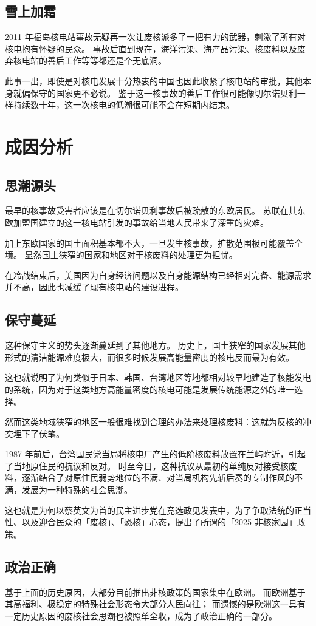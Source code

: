 \section{雪上加霜}

2011 年福岛核电站事故无疑再一次让废核派多了一把有力的武器，刺激了所有对核电抱有怀疑的民众。
事故后直到现在，海洋污染、海产品污染、核废料以及废弃核电站的善后工作等等都还是个无底洞。

此事一出，即使是对核电发展十分热衷的中国也因此收紧了核电站的审批，其他本身就偏保守的国家更不必说。
鉴于这一核事故的善后工作很可能像切尔诺贝利一样持续数十年，这一次核电的低潮很可能不会在短期内结束。

\chapter{成因分析}

\section{思潮源头}

最早的核事故受害者应该是在切尔诺贝利事故后被疏散的东欧居民。
苏联在其东欧加盟国建立的这一核电站引发的事故给当地人民带来了深重的灾难。

加上东欧国家的国土面积基本都不大，一旦发生核事故，扩散范围极可能覆盖全境。
显然国土狭窄的国家和地区对于核废料的处理更为担忧。

在冷战结束后，美国因为自身经济问题以及自身能源结构已经相对完备、能源需求并不高，因此也减缓了现有核电站的建设进程。

\section{保守蔓延}

这种保守主义的势头逐渐蔓延到了其他地方。
历史上，国土狭窄的国家发展其他形式的清洁能源难度极大，而很多时候发展高能量密度的核电反而最为有效。

这也就说明了为何类似于日本、韩国、台湾地区等地都相对较早地建造了核能发电的系统，因为对于这类地方高能量密度的核电可能是发展传统能源之外的唯一选择。

然而这类地域狭窄的地区一般很难找到合理的办法来处理核废料：这就为反核的冲突埋下了伏笔。

1987 年前后，台湾国民党当局将核电厂产生的低阶核废料放置在兰屿附近，引起了当地原住民的抗议和反对\cite{hsl}。
时至今日，这种抗议从最初的单纯反对接受核废料，逐渐结合了对原住民弱势地位的不满、对当局机构先斩后奏的专制作风的不满，发展为一种特殊的社会思潮。

这也就是为何以蔡英文为首的民主进步党在竞选政见发表中，为了争取法统的正当性、以及迎合民众的「废核」、「恐核」心态，提出了所谓的「2025 非核家园」政策\cite{hemx1}。

\section{政治正确}

基于上面的历史原因，大部分目前推出非核政策的国家集中在欧洲。
而欧洲基于其高福利、极稳定的特殊社会形态令大部分人民向往；
而遗憾的是欧洲这一具有一定历史原因的废核社会思潮也被照单全收，成为了政治正确的一部分\cite{hemx2}。

